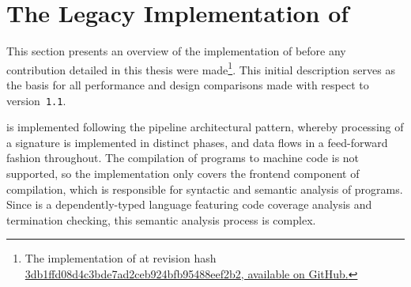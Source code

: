 \section{The Legacy Implementation of \Beluga} \label{section:beluga-implementation}

This section presents an overview of the implementation of \Beluga before any contribution detailed in this thesis were made\footnote{The implementation of \Beluga at revision hash \href{https://github.com/Beluga-lang/Beluga/tree/3db1ffd08d4c3bde7ad2ceb924bfb95488eef2b2}{3db1ffd08d4c3bde7ad2ceb924bfb95488eef2b2, available on GitHub.}}.
This initial description serves as the basis for all performance and design comparisons made with respect to \Beluga version~\texttt{1.1}.

\Beluga is implemented following the pipeline architectural pattern, whereby processing of a \Beluga signature is implemented in distinct phases, and data flows in a feed-forward fashion throughout.
The compilation of \Beluga programs to machine code is not supported, so the implementation only covers the frontend component of compilation, which is responsible for syntactic and semantic analysis of programs.
Since \Beluga is a dependently-typed language featuring code coverage analysis and termination checking, this semantic analysis process is complex.

